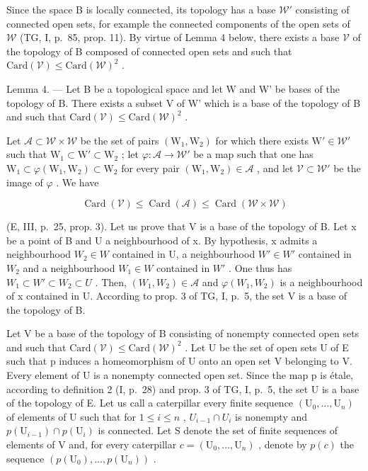 Since the space B is locally connected, its topology has a base \(\mathcal{W}'\) consisting of connected open sets, for example the connected components of the open sets of \(\mathcal{W}\) (TG, I, p.~85, prop. 11). By virtue of Lemma 4 below, there exists a base \(\mathcal{V}\) of the topology of B composed of connected open sets and such that \(\mathrm{Card}(\mathcal{V}) \leqslant \mathrm{Card}(\mathcal{W})^2\) .

Lemma 4. --- Let B be a topological space and let W and W' be bases of the topology of B. There exists a subset V of W' which is a base of the topology of B and such that \(\text{Card}(\mathcal{V}) \leqslant \text{Card}(\mathcal{W})^{2}\) .

Let \(\mathcal{A} \subset \mathcal{W} \times \mathcal{W}\) be the set of pairs \((\mathrm{W}_1, \mathrm{W}_2)\) for which there exists \(\mathrm{W}' \in \mathcal{W}'\) such that \(\mathrm{W}_1 \subset \mathrm{W}' \subset \mathrm{W}_2\) ; let \(\varphi: \mathcal{A} \to \mathcal{W}'\) be a map such that one has \(\mathrm{W}_1 \subset \varphi(\mathrm{W}_1, \mathrm{W}_2) \subset \mathrm{W}_2\) for every pair \((\mathrm{W}_1, \mathrm{W}_2) \in \mathcal{A}\) , and let \(\mathcal{V} \subset \mathcal{W}'\) be the image of \(\varphi\) . We have

\[
\operatorname{Card} (\mathcal {V}) \leqslant \operatorname{Card} (\mathcal {A}) \leqslant \operatorname{Card} (\mathcal {W} \times \mathcal {W})
\]

(E, III, p.~25, prop. 3). Let us prove that V is a base of the topology of B. Let x be a point of B and U a neighbourhood of x. By hypothesis, x admits a neighbourhood \(W_{2} \in W\) contained in U, a neighbourhood \(W' \in W'\) contained in \(W_{2}\) and a neighbourhood \(W_{1} \in W\) contained in \(W'\) . One thus has \(W_{1} \subset W' \subset W_{2} \subset U\) . Then, \((W_{1}, W_{2}) \in \mathscr{A}\) and \(\varphi(W_{1}, W_{2})\) is a neighbourhood of x contained in U. According to prop. 3 of TG, I, p.~5, the set V is a base of the topology of B.

Let V be a base of the topology of B consisting of nonempty connected open sets and such that \(\text{Card}(\mathcal{V}) \leqslant \text{Card}(\mathcal{W})^{2}\) . Let U be the set of open sets U of E such that p induces a homeomorphism of U onto an open set V belonging to V. Every element of U is a nonempty connected open set. Since the map p is étale, according to definition 2 (I, p.~28) and prop. 3 of TG, I, p.~5, the set U is a base of the topology of E. Let us call a caterpillar every finite sequence \((\mathrm{U}_{0}, \ldots, \mathrm{U}_{n})\) of elements of U such that for \(1 \leqslant i \leqslant n\) , \(U_{i-1} \cap U_{i}\) is nonempty and \(p(\mathrm{U}_{i-1}) \cap p(\mathrm{U}_{i})\) is connected. Let S denote the set of finite sequences of elements of V and, for every caterpillar \(c = (\mathrm{U}_{0}, \ldots, \mathrm{U}_{n})\) , denote by \(p(c)\) the sequence \((p(\mathrm{U}_{0}), \ldots, p(\mathrm{U}_{n}))\) .

